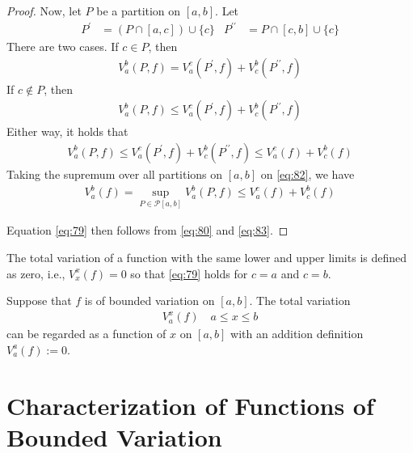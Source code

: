\documentclass[thmcnt=section, 12pt]{my-elegantbook}
\begin{document}
\begin{proof}
    \par Now, let $P$ be a partition on $[a, b]$. Let
    \begin{align*}
        P^\prime &= (P \cap [a, c]) \cup \{ c \} & 
        P^{\prime\prime} &= P \cap [c, b] \cup \{ c \}
    \end{align*}
    There are two cases. If $c \in P$, then
    \begin{align*}
        V_a^b(P, f) 
        = V_a^c(P^\prime, f) + V_c^b(P^{\prime\prime}, f)
    \end{align*}
    If $c \notin P$, then 
    \begin{align*}
        V_a^b(P, f) 
        \leq V_a^c(P^\prime, f) + V_c^b(P^{\prime\prime}, f)
    \end{align*}
    Either way, it holds that 
    \begin{align}
        V_a^b(P, f) 
        \leq V_a^c(P^\prime, f) + V_c^b(P^{\prime\prime}, f)
        \leq V_a^c(f) + V_c^b(f)
        \label{eq:82}
    \end{align}
    Taking the supremum over all partitions on $[a, b]$ on \eqref{eq:82}, we have 
    \begin{align}
        V_a^b(f)
        = \sup_{P \in \mathcal{P}[a, b]} V_a^b(P, f) 
        \leq V_a^c(f) + V_c^b(f)
        \label{eq:83}
    \end{align}

    Equation \eqref{eq:79} then follows from \eqref{eq:80} and \eqref{eq:83}.
\end{proof}

The total variation of a function with the same lower and upper limits is defined as zero, i.e., $V_x^x(f) = 0$ so that \eqref{eq:79} holds for $c = a$ and $c = b$.

\begin{definition} \label{def:3}
    Suppose that $f$ is of bounded variation on $[a, b]$. The total variation
    \begin{align*}
        V_a^x(f) \quad a \leq x \leq b
    \end{align*}
    can be regarded as a function of $x$ on $[a, b]$ with an addition definition $V_a^a(f) := 0$.
\end{definition}


\section{Characterization of Functions of Bounded Variation}
\end{document}
